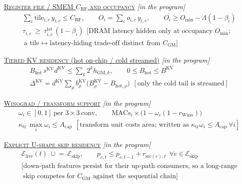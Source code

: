 \begin{landscape}
\begin{center}
{\begin{minipage}{0.965\linewidth}
\begin{minipage}[t]{0.485\linewidth}
\underline{\textsc{Register file / SMEM} $C_{\mathrm{RF}}$ \textsc{and occupancy}} \hfill\emph{[in the program]}
\vspace{-4pt}
\begin{align*}
&\textstyle\sum_c \mathrm{tile}_{i,c}\,y_{i,c}\le C_{\mathrm{RF}},\qquad
 O_i=\textstyle\sum_c o_{i,c}\,y_{i,c},\qquad O_i\ge O_{\min}-\Lambda(1-\beta_i)\\[-2pt]
&\tau_{i,c}\ \ge\ \tau^{\mathrm{lat}}_{i,c}\,(1-\beta_i)\ \ [\text{DRAM latency hidden only at occupancy }O_{\min};\\[-2pt]
&\ \text{a tile}\leftrightarrow\text{latency-hiding trade-off distinct from }C_{\mathrm{GM}}]
\end{align*}
\end{minipage}%
\hfill
\vrule
\hfill
\begin{minipage}[t]{0.485\linewidth}
\underline{\textsc{Tiered KV residency} (hot on-chip / cold streamed)} \hfill\emph{[in the program]}
\vspace{-4pt}
\begin{align*}
&B_{\mathrm{hot}}\,s^{\mathrm{KV}}d^{\mathrm{KV}}\le\textstyle\sum_k 2^k h_{\mathrm{GM},k},\qquad 0\le B_{\mathrm{hot}}\le B^{\mathrm{KV}}\\[-2pt]
&\Delta^{\mathrm{KV}}=d^{\mathrm{KV}}\textstyle\sum_\rho b^{\mathrm{KV}}_\rho\big(B^{\mathrm{KV}}_\rho-B_{\mathrm{hot},\rho}\big)\ \ [\text{only the cold tail is streamed}]
\end{align*}
\vspace{-9pt}

\underline{\textsc{Winograd / transform support}} \hfill\emph{[in the program]}
\vspace{-4pt}
\begin{align*}
&\omega_i\in[0,1]\ \text{per }3{\times}3\ \text{conv},\qquad
 \mathrm{MACs}_i\times\big(1-\omega_i(1-r_{\mathrm{Wino}})\big)\\[-2pt]
&\kappa_{\mathrm{tr}}\,\max_i\omega_i\le A_{\mathrm{cap}}\ \ [\text{transform unit costs area; written as }\kappa_{\mathrm{tr}}\omega_i\le A_{\mathrm{cap}}\ \forall i]
\end{align*}
\vspace{-9pt}

\underline{\textsc{Explicit U-shape skip residency}} \hfill\emph{[in the program]}
\vspace{-4pt}
\begin{align*}
&\mathcal E_{\mathrm{live}}(t)\ \cup\!=\ \mathcal E_{\mathrm{skip}},\qquad
 p_{e,t}\le p_{e,t-1}+r_{\mathrm{src}(e),t}\ \ \forall e\in\mathcal E_{\mathrm{skip}}\\[-2pt]
&[\text{down-path features persist for their up-path consumers, so a long-range}\\[-2pt]
&\ \text{skip competes for }C_{\mathrm{GM}}\text{ against the sequential chain}]
\end{align*}
\vspace{-9pt}


\end{minipage}
\end{minipage}}
\end{center}
\end{landscape}
